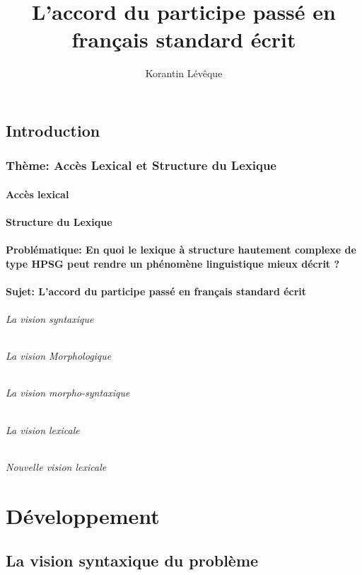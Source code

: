 \documentclass[11pt,a4paper]{book}
\author{Korantin Lévêque}
\title{L'accord du participe passé en français standard écrit}
\begin{document}
\chapter{Introduction}
\section{Thème: Accès Lexical et Structure du Lexique}
\subsection{Accès lexical}
\subsection{Structure du Lexique}
\subsection{Problématique: En quoi le lexique à structure hautement complexe de type HPSG peut rendre un phénomène linguistique mieux décrit ?}
\subsection{Sujet: L'accord du participe passé en français standard écrit}
\paragraph{La vision syntaxique}
\paragraph{La vision Morphologique}
\paragraph{La vision morpho-syntaxique}
\paragraph{La vision lexicale}
\paragraph{Nouvelle vision lexicale}


\part{Développement}
\chapter{La vision syntaxique du problème}
\end{document}
